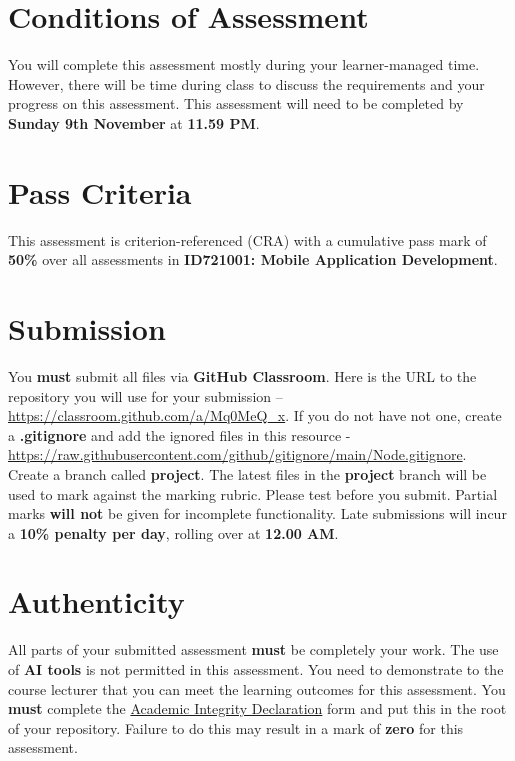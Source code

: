 \documentclass{article}
\begin{document}
\section*{Conditions of Assessment}
You will complete this assessment mostly during your learner-managed time. However, there will be time during class to discuss the requirements and your progress on this assessment. This assessment will need to be completed by \textbf{Sunday 9th November} at \textbf{11.59 PM}. 

\section*{Pass Criteria}
This assessment is criterion-referenced (CRA) with a cumulative pass mark of \textbf{50\%} over all assessments in \textbf{ID721001: Mobile Application Development}.

\section*{Submission}
You \textbf{must} submit all files via \textbf{GitHub Classroom}. Here is the URL to the repository you will use for your submission – \href{https://classroom.github.com/a/Mq0MeQ\_x}{https://classroom.github.com/a/Mq0MeQ\_x}. If you do not have not one, create a \textbf{.gitignore} and add the ignored files in this resource - \href{https://raw.githubusercontent.com/github/gitignore/main/Node.gitignore}{https://raw.githubusercontent.com/github/gitignore/main/Node.gitignore}. \\

Create a branch called \textbf{project}. The latest files in the \textbf{project} branch will be used to mark against the marking rubric. Please test before you submit. Partial marks \textbf{will not} be given for incomplete functionality. Late submissions will incur a \textbf{10\% penalty per day}, rolling over at \textbf{12.00 AM}.

\section*{Authenticity}
All parts of your submitted assessment \textbf{must} be completely your work. The use of \textbf{AI tools} is not permitted in this assessment. You need to demonstrate to the course lecturer that you can meet the learning outcomes for this assessment. You \textbf{must} complete the \href{https://moodle.op.ac.nz/mod/page/view.php?id=1178172}{Academic Integrity Declaration} form and put this in the root of your repository. Failure to do this may result in a mark of \textbf{zero} for this assessment.
\end{document}
